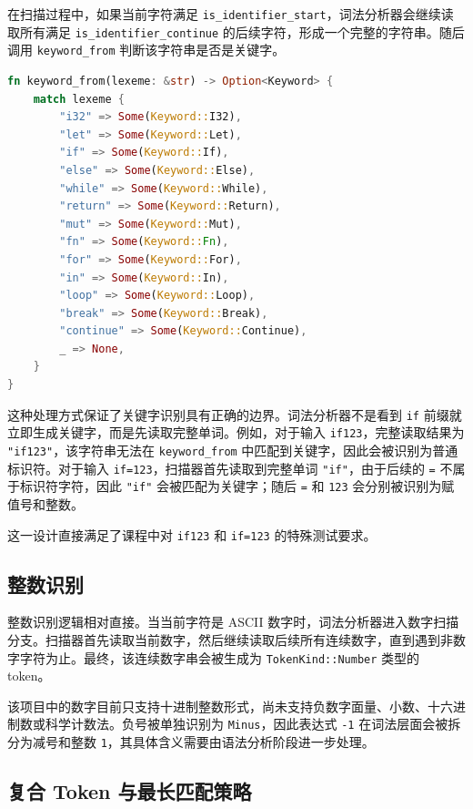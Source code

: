 \documentclass[UTF8,a4paper,12pt]{ctexart}
\begin{document}
在扫描过程中，如果当前字符满足 \texttt{is\_identifier\_start}，词法分析器会继续读取所有满足 \texttt{is\_identifier\_continue} 的后续字符，形成一个完整的字符串。随后调用 \texttt{keyword\_from} 判断该字符串是否是关键字。

\begin{lstlisting}[language=Rust,caption={关键字匹配函数}]
fn keyword_from(lexeme: &str) -> Option<Keyword> {
    match lexeme {
        "i32" => Some(Keyword::I32),
        "let" => Some(Keyword::Let),
        "if" => Some(Keyword::If),
        "else" => Some(Keyword::Else),
        "while" => Some(Keyword::While),
        "return" => Some(Keyword::Return),
        "mut" => Some(Keyword::Mut),
        "fn" => Some(Keyword::Fn),
        "for" => Some(Keyword::For),
        "in" => Some(Keyword::In),
        "loop" => Some(Keyword::Loop),
        "break" => Some(Keyword::Break),
        "continue" => Some(Keyword::Continue),
        _ => None,
    }
}
\end{lstlisting}

这种处理方式保证了关键字识别具有正确的边界。词法分析器不是看到 \texttt{if} 前缀就立即生成关键字，而是先读取完整单词。例如，对于输入 \texttt{if123}，完整读取结果为 \texttt{"if123"}，该字符串无法在 \texttt{keyword\_from} 中匹配到关键字，因此会被识别为普通标识符。对于输入 \texttt{if=123}，扫描器首先读取到完整单词 \texttt{"if"}，由于后续的 \texttt{=} 不属于标识符字符，因此 \texttt{"if"} 会被匹配为关键字；随后 \texttt{=} 和 \texttt{123} 会分别被识别为赋值号和整数。

这一设计直接满足了课程中对 \texttt{if123} 和 \texttt{if=123} 的特殊测试要求。

\subsection{整数识别}

整数识别逻辑相对直接。当当前字符是 ASCII 数字时，词法分析器进入数字扫描分支。扫描器首先读取当前数字，然后继续读取后续所有连续数字，直到遇到非数字字符为止。最终，该连续数字串会被生成为 \texttt{TokenKind::Number} 类型的 token。

该项目中的数字目前只支持十进制整数形式，尚未支持负数字面量、小数、十六进制数或科学计数法。负号被单独识别为 \texttt{Minus}，因此表达式 \texttt{-1} 在词法层面会被拆分为减号和整数 \texttt{1}，其具体含义需要由语法分析阶段进一步处理。

\subsection{复合 Token 与最长匹配策略}
\end{document}

